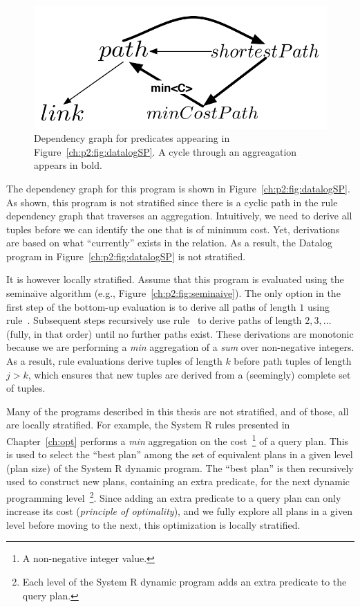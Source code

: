 \begin{figure} 
\ssp
\begin{center}
\includegraphics[scale=0.75]{figures/dependency-graph2}
\caption{\label{ch:p2:fig:dependency2}Dependency graph for predicates 
appearing in Figure~\ref{ch:p2:fig:datalogSP}. A cycle through an aggreagation
appears in bold. }
\end{center} 
\end{figure}

The dependency graph for this program is shown in
Figure~\ref{ch:p2:fig:datalogSP}.  As shown, this program is not stratified
since there is a cyclic path in the rule dependency graph that traverses an
aggregation.  Intuitively, we need to derive all  tuples before we can
identify the one that is of minimum cost.  Yet,  derivations are based
on what ``currently'' exists in the  relation.  As a result,
the Datalog program in Figure~\ref{ch:p2:fig:datalogSP} is not stratified.

It is however locally stratified.  Assume that this program is evaluated using
the semina\"{\i}ve algorithm (e.g., Figure~\ref{ch:p2:fig:seminaive}).  The
only option in the first step of the bottom-up evaluation is to derive all
paths of length $1$ using rule~.  Subsequent steps recursively use
rule~ to derive paths of length $2, 3, \ldots$ (fully, in that order)
until no further paths exist.  These derivations are monotonic because we are
performing a {\em min} aggregation of a {\em sum} over non-negative integers.
As a result, rule evaluations derive  tuples of length $k$ before path
tuples of length $j > k$, which ensures that new  tuples are derived
from a (seemingly) complete set of  tuples.

Many of the programs described in this thesis are not stratified, and of those,
all are locally stratified.  For example, the System R rules presented in
Chapter~\ref{ch:opt} performs a {\em min} aggregation on the cost~\footnote{ A
non-negative integer value.} of a query plan.  This is used to select the
``best plan'' among the set of equivalent plans in a given level (plan size) of
the System R dynamic program.  The ``best plan'' is then recursively used to
construct new plans, containing an extra predicate, for the next dynamic
programming level~\footnote{Each level of the System R dynamic program adds an
extra predicate to the query plan.}.  Since adding an extra predicate to a
query plan can only increase its cost ({\em principle of optimality}), and we
fully explore all plans in a given level before moving to the next, this
optimization is locally stratified.



